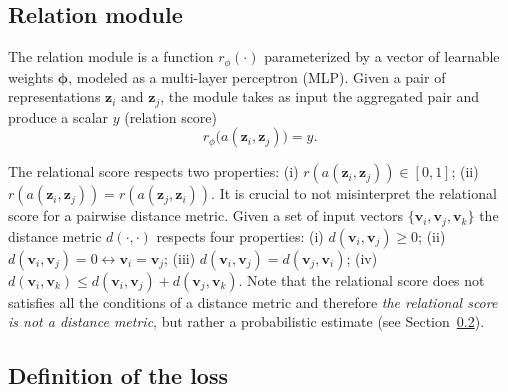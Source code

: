 \documentclass{article}
\begin{document}
\subsection{Relation module}\label{ssec:relation_module}

The relation module is a function $r_{\phi}(\cdot)$ parameterized by a vector of learnable weights $\boldsymbol{\phi}$, modeled as a multi-layer perceptron (MLP). Given a pair of representations $\mathbf{z}_i$ and $\mathbf{z}_j$, the module takes as input the aggregated pair and produce a scalar $y$ (relation score)
\begin{equation}
r_{\phi} \big( a(\mathbf{z}_i, \mathbf{z}_j) \big)=y.
\end{equation}

The relational score respects two properties: (i) $r(a(\mathbf{z}_i, \mathbf{z}_j)) \in [0,1]$; (ii) $r(a(\mathbf{z}_i, \mathbf{z}_j))=r(a(\mathbf{z}_j, \mathbf{z}_i))$.
It is crucial to not misinterpret the relational score for a pairwise distance metric. Given a set of input vectors $\{ \mathbf{v}_i, \mathbf{v}_j, \mathbf{v}_k \}$ the distance metric $d(\cdot, \cdot)$ respects four properties: (i) $d(\mathbf{v}_i, \mathbf{v}_j) \geq 0$; (ii) $d(\mathbf{v}_i, \mathbf{v}_j) = 0 \leftrightarrow \mathbf{v}_i=\mathbf{v}_j$; (iii) $d(\mathbf{v}_i,\mathbf{v}_j)=d(\mathbf{v}_j,\mathbf{v}_i)$; (iv) $d(\mathbf{v}_i,\mathbf{v}_k) \leq d(\mathbf{v}_i,\mathbf{v}_j)+d(\mathbf{v}_j,\mathbf{v}_k)$.  Note that the relational score does not satisfies all the conditions of a distance metric and therefore \emph{the relational score is not a distance metric}, but rather a probabilistic estimate (see Section~\ref{ssec:definition_loss}).

\subsection{Definition of the loss}\label{ssec:definition_loss}
\end{document}
